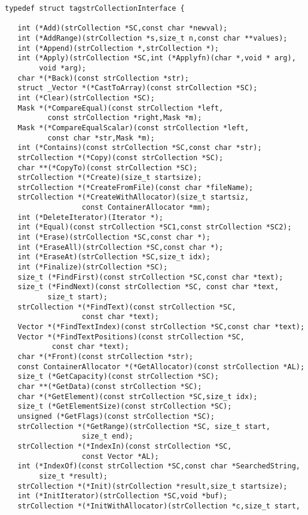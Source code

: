 \begin{verbatim}
typedef struct tagstrCollectionInterface {
   
   int (*Add)(strCollection *SC,const char *newval);
   int (*AddRange)(strCollection *s,size_t n,const char **values);
   int (*Append)(strCollection *,strCollection *);
   int (*Apply)(strCollection *SC,int (*Applyfn)(char *,void * arg),
        void *arg);
   char *(*Back)(const strCollection *str);
   struct _Vector *(*CastToArray)(const strCollection *SC);
   int (*Clear)(strCollection *SC);
   Mask *(*CompareEqual)(const strCollection *left,
          const strCollection *right,Mask *m);
   Mask *(*CompareEqualScalar)(const strCollection *left,
          const char *str,Mask *m);
   int (*Contains)(const strCollection *SC,const char *str);
   strCollection *(*Copy)(const strCollection *SC);
   char **(*CopyTo)(const strCollection *SC);
   strCollection *(*Create)(size_t startsize);
   strCollection *(*CreateFromFile)(const char *fileName);
   strCollection *(*CreateWithAllocator)(size_t startsiz,
                  const ContainerAllocator *mm);
   int (*DeleteIterator)(Iterator *);
   int (*Equal)(const strCollection *SC1,const strCollection *SC2);
   int (*Erase)(strCollection *SC,const char *);
   int (*EraseAll)(strCollection *SC,const char *);
   int (*EraseAt)(strCollection *SC,size_t idx);
   int (*Finalize)(strCollection *SC);
   size_t (*FindFirst)(const strCollection *SC,const char *text);
   size_t (*FindNext)(const strCollection *SC, const char *text,
          size_t start);
   strCollection *(*FindText)(const strCollection *SC,
                  const char *text);
   Vector *(*FindTextIndex)(const strCollection *SC,const char *text);
   Vector *(*FindTextPositions)(const strCollection *SC,
           const char *text);
   char *(*Front)(const strCollection *str);
   const ContainerAllocator *(*GetAllocator)(const strCollection *AL);
   size_t (*GetCapacity)(const strCollection *SC);
   char **(*GetData)(const strCollection *SC);
   char *(*GetElement)(const strCollection *SC,size_t idx);
   size_t (*GetElementSize)(const strCollection *SC);
   unsigned (*GetFlags)(const strCollection *SC);
   strCollection *(*GetRange)(strCollection *SC, size_t start,
                  size_t end);
   strCollection *(*IndexIn)(const strCollection *SC,
                  const Vector *AL);
   int (*IndexOf)(const strCollection *SC,const char *SearchedString,
        size_t *result);
   strCollection *(*Init)(strCollection *result,size_t startsize);
   int (*InitIterator)(strCollection *SC,void *buf);
   strCollection *(*InitWithAllocator)(strCollection *c,size_t start,

\end{verbatim}
